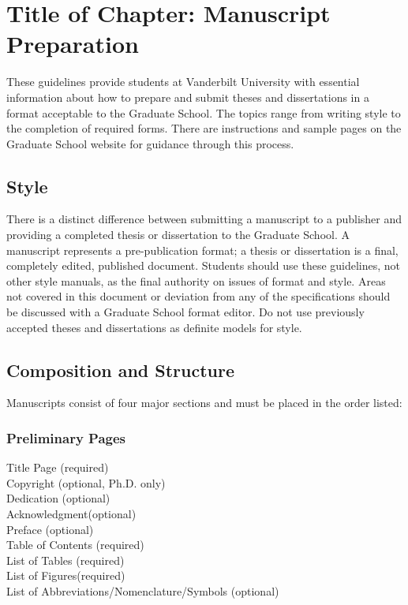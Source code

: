 

\chapter{Title of Chapter: Manuscript Preparation} \label{CH1_Introduction}
These guidelines provide students at Vanderbilt University with essential information about how to prepare and submit theses and dissertations in a format acceptable to the Graduate School. The topics range from writing style to the completion of required forms. There are instructions and sample pages on the Graduate School website for guidance through this process.


\section{Style}
There is a distinct difference between submitting a manuscript to a publisher and providing a completed thesis or dissertation to the Graduate School. A manuscript represents a pre-publication format; a thesis or dissertation is a final, completely edited, published document. Students should use these guidelines, not other style manuals, as the final authority on issues of format and style. Areas not covered in this document or deviation from any of the specifications should be discussed with a Graduate School format editor. Do not use previously accepted theses and dissertations as definite models for style.

\section{Composition and Structure}
Manuscripts consist of four major sections and must be placed in the order listed:


\subsection{Preliminary Pages}
Title Page (required) \\
Copyright (optional, Ph.D. only) \\
Dedication (optional)  \\
Acknowledgment(optional) \\
Preface (optional) \\
Table of Contents (required) \\ 
List of Tables (required) \\
List of Figures(required) \\
List of Abbreviations/Nomenclature/Symbols (optional)


